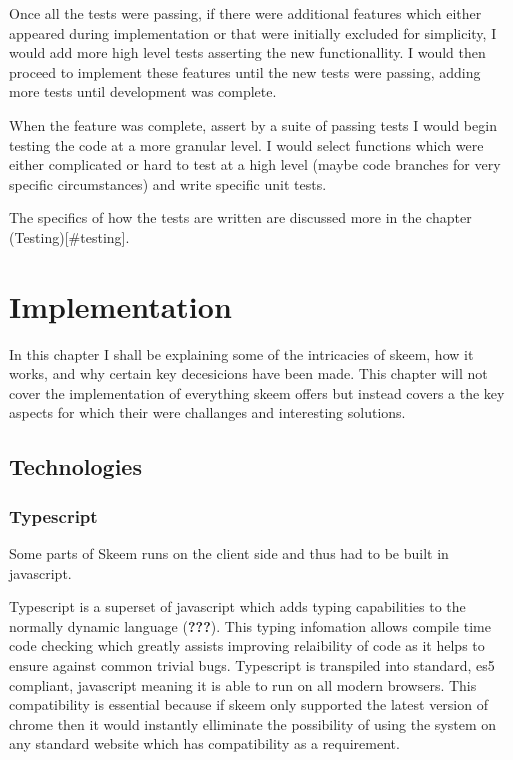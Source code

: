 \documentclass[
  12pt,
]{article}
\begin{document}
Once all the tests were passing, if there were additional features which
either appeared during implementation or that were initially excluded
for simplicity, I would add more high level tests asserting the new
functionallity. I would then proceed to implement these features until
the new tests were passing, adding more tests until development was
complete.

When the feature was complete, assert by a suite of passing tests I
would begin testing the code at a more granular level. I would select
functions which were either complicated or hard to test at a high level
(maybe code branches for very specific circumstances) and write specific
unit tests.

The specifics of how the tests are written are discussed more in the
chapter (Testing){[}\#testing{]}.

\hypertarget{implementation}{%
\section{Implementation}\label{implementation}}

In this chapter I shall be explaining some of the intricacies of skeem,
how it works, and why certain key decesicions have been made. This
chapter will not cover the implementation of everything skeem offers but
instead covers a the key aspects for which their were challanges and
interesting solutions.

\hypertarget{technologies}{%
\subsection{Technologies}\label{technologies}}

\hypertarget{typescript}{%
\subsubsection{Typescript}\label{typescript}}

Some parts of Skeem runs on the client side and thus had to be built in
javascript.

Typescript is a superset of javascript which adds typing capabilities to
the normally dynamic language ({\textbf{???}}). This typing infomation
allows compile time code checking which greatly assists improving
relaibility of code as it helps to ensure against common trivial bugs.
Typescript is transpiled into standard, es5 compliant, javascript
meaning it is able to run on all modern browsers. This compatibility is
essential because if skeem only supported the latest version of chrome
then it would instantly elliminate the possibility of using the system
on any standard website which has compatibility as a requirement.
\end{document}
